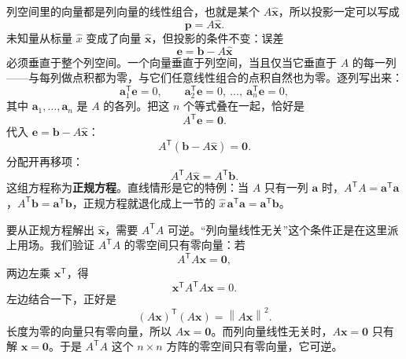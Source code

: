 \documentclass[UTF8,a4paper,12pt]{ctexart}
\numberwithin{equation}{section}
\newcommand{\norm}[1]{\left\lVert #1 \right\rVert}
\newcommand{\trans}{^{\mathsf T}}
\begin{document}
	列空间里的向量都是列向量的线性组合，也就是某个 $A\hat{\bm{x}}$，所以投影一定可以写成
	\begin{equation}\label{eq:6.38}
	\bm{p}=A\hat{\bm{x}}.
	\end{equation}
	未知量从标量 $\hat{x}$ 变成了向量 $\hat{\bm{x}}$，但投影的条件不变：误差
	\begin{equation}\label{eq:6.39}
	\bm{e}=\bm{b}-A\hat{\bm{x}}
	\end{equation}
	必须垂直于整个列空间。一个向量垂直于列空间，当且仅当它垂直于 $A$ 的每一列——与每列做点积都为零，与它们任意线性组合的点积自然也为零。逐列写出来：
	\begin{equation}\label{eq:6.40}
	\bm{a}_1\trans\bm{e}=0,
	\qquad
	\bm{a}_2\trans\bm{e}=0,
	\ \ldots,\ 
	\bm{a}_n\trans\bm{e}=0,
	\end{equation}
	其中 $\bm{a}_1,\ldots,\bm{a}_n$ 是 $A$ 的各列。把这 $n$ 个等式叠在一起，恰好是
	\begin{equation}\label{eq:6.41}
	A\trans\bm{e}=\bm{0}.
	\end{equation}
	代入 $\bm{e}=\bm{b}-A\hat{\bm{x}}$：
	\begin{equation}\label{eq:6.42}
	A\trans(\bm{b}-A\hat{\bm{x}})=\bm{0}.
	\end{equation}
	分配开再移项：
	\begin{equation}\label{eq:6.43}
	\boxed{A\trans A\hat{\bm{x}}=A\trans\bm{b}.}
	\end{equation}
	这组方程称为\textbf{正规方程}。直线情形是它的特例：当 $A$ 只有一列 $\bm{a}$ 时，$A\trans A=\bm{a}\trans\bm{a}$，$A\trans\bm{b}=\bm{a}\trans\bm{b}$，正规方程就退化成上一节的 $\hat{x}\,\bm{a}\trans\bm{a}=\bm{a}\trans\bm{b}$。

	要从正规方程解出 $\hat{\bm{x}}$，需要 $A\trans A$ 可逆。“列向量线性无关”这个条件正是在这里派上用场。我们验证 $A\trans A$ 的零空间只有零向量：若
	\begin{equation}\label{eq:6.44}
	A\trans A\bm{x}=\bm{0},
	\end{equation}
	两边左乘 $\bm{x}\trans$，得
	\begin{equation}\label{eq:6.45}
	\bm{x}\trans A\trans A\bm{x}=0.
	\end{equation}
	左边结合一下，正好是
	\begin{equation}\label{eq:6.46}
	(A\bm{x})\trans(A\bm{x})=\norm{A\bm{x}}^2.
	\end{equation}
	长度为零的向量只有零向量，所以 $A\bm{x}=\bm{0}$。而列向量线性无关时，$A\bm{x}=\bm{0}$ 只有解 $\bm{x}=\bm{0}$。于是 $A\trans A$ 这个 $n\times n$ 方阵的零空间只有零向量，它可逆。
\end{document}
